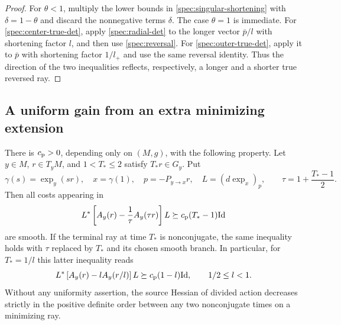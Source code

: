 \begin{proof}
For $\theta<1$, multiply the lower bounds in
\eqref{spec:singular-shortening} with $\delta=1-\theta$ and discard
the nonnegative terms $\delta$.  The case $\theta=1$ is immediate.
For \eqref{spec:center-true-det}, apply \eqref{spec:radial-det} to
the longer vector $\bar p/l$ with shortening factor $l$, and then
use \eqref{spec:reversal}.  For \eqref{spec:outer-true-det}, apply
it to $\bar p$ with shortening factor $1/l_+$ and use the same
reversal identity.  Thus the direction of the two inequalities
reflects, respectively, a longer and a shorter true reversed ray.
\end{proof}

\subsection{A uniform gain from an extra minimizing extension}

\begin{lemma}\label{spec:pullback}
There is $c_{\rm p}>0$, depending only on $(M,g)$, with the following
property.  Let $y\in M$, $r\in T_yM$, and $1<T_*\le2$ satisfy
$T_*r\in G_y$.  Put
\[
  \gamma(s)=\exp_y(sr),\quad x=\gamma(1),\quad
  p=-P_{y\to x}r,\quad L=(d\exp_x)_p,
  \qquad \tau=1+\frac{T_*-1}{2}.
\]
Then all costs appearing in
\begin{equation}\label{spec:half-extension-gain}
  L^*\left[A_y(r)-\frac1\tau A_y(\tau r)\right]L
       \succeq c_{\rm p}(T_*-1)\mathrm{Id}
\end{equation}
are smooth.  If the terminal ray at time $T_*$ is nonconjugate,
the same inequality holds with $\tau$ replaced by $T_*$ and its
chosen smooth branch.  In particular, for $T_*=1/l$ this latter
inequality reads
\begin{equation}\label{spec:full-extension-gain}
  L^*\left[A_y(r)-l A_y(r/l)\right]L
       \succeq c_{\rm p}(1-l)\mathrm{Id},
       \qquad 1/2\le l<1.
\end{equation}
Without any uniformity assertion, the source Hessian of divided
action decreases strictly in the positive definite order between
any two nonconjugate times on a minimizing ray.
\end{lemma}

